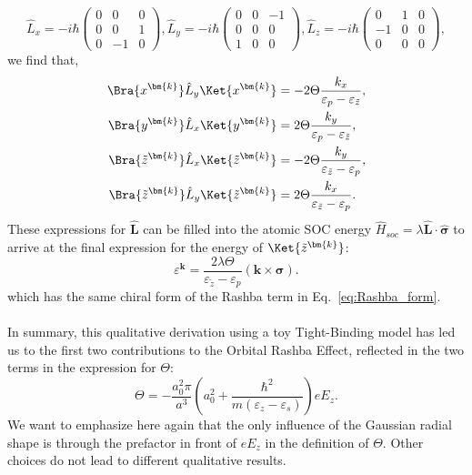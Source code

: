 \begin{equation}
	\hat{L}_x =-i\hbar\left(\begin{matrix}0&0&0\\0&0&1\\0&-1&0\end{matrix}\right), \hat{L}_y = -i\hbar \left(\begin{matrix}0&0&-1\\0&0&0\\1&0&0\end{matrix}\right), \hat{L}_z =-i\hbar\left(\begin{matrix}0&1&0\\-1&0&0\\0&0&0\end{matrix}\right),
\end{equation}
we find that,
\begin{align}
	\label{eq:oam_from_k}
	\Bra{x^{\bm{k}}} \hat{L}_y \Ket{x^{\bm{k}}} &= -2 \Theta \frac{k_x}{\varepsilon_p - \varepsilon_{\tilde{z}}},\\
	\Bra{y^{\bm{k}}} \hat{L}_x \Ket{y^{\bm{k}}} &= 2 \Theta \frac{k_y}{\varepsilon_p - \varepsilon_{\tilde{z}}},\\
	\Bra{\tilde{z}^{\bm{k}}} \hat{L}_x \Ket{\tilde{z}^{\bm{k}}} &= - 2 \Theta \frac{k_y}{\varepsilon_{\tilde{z}} - \varepsilon_p},\\ 
	\Bra{\tilde{z}^{\bm{k}}} \hat{L}_y \Ket{\tilde{z}^{\bm{k}}} &= 2 \Theta \frac{k_x}{\varepsilon_{\tilde{z}}-\varepsilon_p}\label{eq:oam_from_k_final}.
\end{align}
These expressions for $\hat{\bm{L}}$ can be filled into the atomic SOC energy $\hat{H}_{soc}= \lambda \hat{\bm{L}} \cdot \hat{\bm{\sigma}}$ to arrive at the final expression for the energy of $\Ket{\tilde{z}^{\bm{k}}}$:
\begin{equation}
	\label{eq:Rashba_from_OAM}
	\varepsilon^{\bm{k}} = \frac{2 \lambda \Theta}{\varepsilon_{\tilde{z}}-\varepsilon_p}(\bm{k} \times \bm{\sigma}).
\end{equation}
which has the same chiral form of the Rashba term in Eq.~\eqref{eq:Rashba_form}.
\\\\
In summary, this qualitative derivation using a toy Tight-Binding model has led us to the first two contributions to the Orbital Rashba Effect, reflected in the two terms in the expression for $\Theta$:
\begin{equation}
	\label{eq:Rashba_theta}
\Theta = -\frac{a_0^2 \pi}{a^3}\left(a_0^2 + \frac{\hbar^2}{m(\varepsilon_z - \varepsilon_s)}\right) e E_z.
\end{equation}
We want to emphasize here again that the only influence of the Gaussian radial shape is through the prefactor in front of $e E_z$ in the definition of $\Theta$.
Other choices do not lead to different qualitative results.

